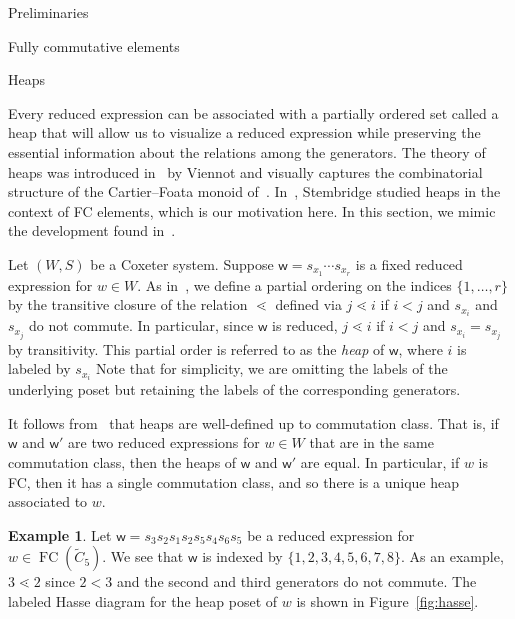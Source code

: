 \documentclass[11pt]{amsart}
\theoremstyle{definition}
\newtheorem{example}[theorem]{Example}
\numberwithin{equation}{section}
\newcommand{\C}{\widetilde{C}}
\renewcommand{\(}{\left(}
\renewcommand{\)}{\right)}
\newcommand{\w}{\mathsf{w}}
\DeclareMathOperator{\FC}{FC}
\begin{document}
\begin{section}{Preliminaries}
\begin{subsection}{Fully commutative elements}
\end{subsection}


\begin{subsection}{Heaps}\label{subsec:heaps}

Every reduced expression can be associated with a partially ordered set called a heap that will allow us to visualize a reduced expression  while preserving the essential information about the relations among the generators.  The theory of heaps was introduced in~\cite{Viennot1986} by Viennot and visually captures the combinatorial structure of the Cartier--Foata monoid of~\cite{Cartier1969}.  In~\cite{Stembridge1996,Stembridge1998}, Stembridge studied heaps in the context of FC elements, which is our motivation here.  In this section, we mimic the development found in~\cite{Billey2007,Ernst2010,Stembridge1996}.

Let $(W,S)$ be a Coxeter system.  Suppose $\w = s_{x_1} \cdots s_{x_r}$ is a fixed reduced expression for $w \in W$.  As in~\cite{Stembridge1996}, we define a partial ordering on the indices $\{1, \dots, r\}$ by the transitive closure of the relation $\lessdot$ defined via $j \lessdot i$ if $i < j$ and $s_{x_i}$ and $s_{x_j}$ do not commute.  In particular, since $\w$ is reduced, $j \lessdot i$ if $i < j$ and $s_{x_i} = s_{x_j}$ by transitivity.  This partial order is referred to as the \emph{heap} of $\w$, where $i$ is labeled by $s_{x_i}$  Note that for simplicity, we are omitting the labels of the underlying poset but retaining the labels of the corresponding generators.

It follows from~\cite[Proposition 2.2]{Stembridge1996} that heaps are well-defined up to commutation class.  That is, if $\w$ and $\w'$ are two reduced expressions for $w \in W$ that are in the same commutation class, then the heaps of $\w$ and $\w'$ are equal.  In particular, if $w$ is FC, then it has a single commutation class, and so there is a unique heap associated to $w$.

\begin{example}\label{ex:first heap}
Let $\w = s_3 s_2 s_1 s_2 s_5s_{4}s_{6}s_{5}$ be a reduced expression for $w \in \FC(\C_{5})$.  We see that $\w$ is indexed by $\{1, 2, 3, 4, 5, 6, 7, 8\}$.  As an example, $3 \lessdot 2$ since $2 < 3$ and the second and third generators do not commute.  The labeled Hasse diagram for the heap poset of $w$ is shown in Figure~\ref{fig:hasse}.
\end{example}


\end{subsection}
\end{section}
\end{document}
